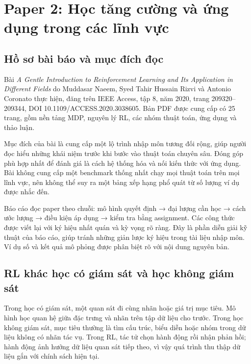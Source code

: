 \section{Paper 2: Học tăng cường và ứng dụng trong các lĩnh
vực}\label{paper-2-hux1ecdc-tux103ng-cux1b0ux1eddng-vuxe0-ux1ee9ng-dux1ee5ng-trong-cuxe1c-lux129nh-vux1ef1c}

\subsection{Hồ sơ bài báo và mục đích
đọc}\label{hux1ed3-sux1a1-buxe0i-buxe1o-vuxe0-mux1ee5c-ux111uxedch-ux111ux1ecdc}

Bài \emph{A Gentle Introduction to Reinforcement Learning and Its
Application in Different Fields} do Muddasar Naeem, Syed Tahir Hussain
Rizvi và Antonio Coronato thực hiện, đăng trên IEEE Access, tập 8, năm
2020, trang 209320--209344, DOI 10.1109/ACCESS.2020.3038605. Bản PDF
được cung cấp có 25 trang, gồm nền tảng MDP, nguyên lý RL, các nhóm
thuật toán, ứng dụng và thảo luận. \cite{naeem}

Mục đích của bài là cung cấp một lộ trình nhập môn tương đối rộng, giúp
người đọc hiểu những khái niệm trước khi bước vào thuật toán chuyên sâu.
Đóng góp phù hợp nhất để đánh giá là cách hệ thống hóa và nối kiến thức
với ứng dụng. Bài không cung cấp một benchmark thống nhất chạy mọi thuật
toán trên mọi lĩnh vực, nên không thể suy ra một bảng xếp hạng phổ quát
từ số lượng ví dụ được nhắc đến.

Báo cáo đọc paper theo chuỗi: mô hình quyết định → đại lượng cần học →
cách ước lượng → điều kiện áp dụng → kiểm tra bằng assignment. Các công
thức được viết lại với ký hiệu nhất quán và kỳ vọng rõ ràng. Đây là phần
diễn giải kỹ thuật của báo cáo, giúp tránh những giản lược ký hiệu trong
tài liệu nhập môn. Ví dụ số và kết quả mô phỏng được phân biệt rõ với
nội dung nguyên bản.

\subsection{RL khác học có giám sát và học không giám
sát}\label{rl-khuxe1c-hux1ecdc-cuxf3-giuxe1m-suxe1t-vuxe0-hux1ecdc-khuxf4ng-giuxe1m-suxe1t}

Trong học có giám sát, một quan sát đi cùng nhãn hoặc giá trị mục tiêu.
Mô hình học quan hệ giữa đặc trưng và nhãn trên tập dữ liệu cho trước.
Trong học không giám sát, mục tiêu thường là tìm cấu trúc, biểu diễn
hoặc nhóm trong dữ liệu không có nhãn tác vụ. Trong RL, tác tử chọn hành
động rồi nhận phản hồi; hành động ảnh hưởng dữ liệu quan sát tiếp theo,
vì vậy quá trình thu thập dữ liệu gắn với chính sách hiện tại.

